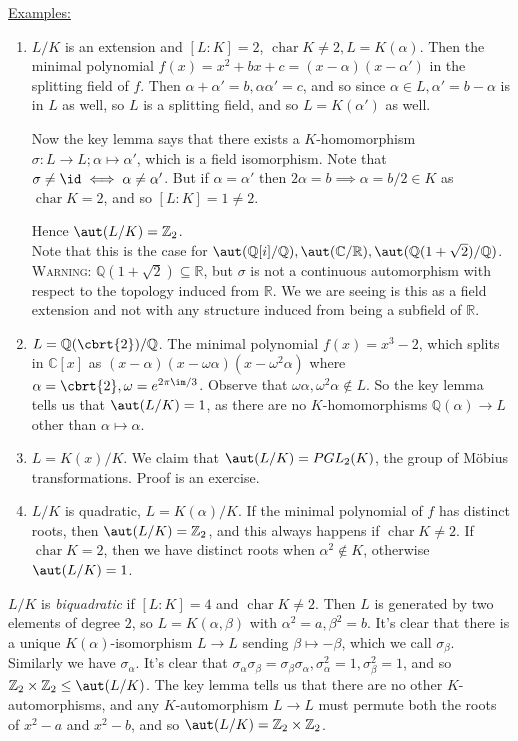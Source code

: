 \documentclass[a4paper, 10pt, twocolumn]{amsart}
\renewcommand{\charr}{\operatorname{char}}
\begin{document}
\underline{Examples:}
\begin{enumerate}
\item $L/K$ is an extension and $[L:K] = 2$, $\charr K \neq 2, L = K(\alpha)$. Then the minimal polynomial $f(x) = x^2 + bx + c = (x-\alpha)(x- \alpha')$ in the splitting field of $f$. Then $\alpha+\alpha' = b, \alpha\alpha' = c$, and so since $\alpha \in L, \alpha' = b-\alpha$ is in $L$ as well, so $L$ is a splitting field, and so $L=K(\alpha')$ as well.

Now the key lemma says that there exists a $K$-homomorphism $\sigma:L \to L; \alpha \mapsto \alpha'$, which is a field isomorphism. Note that $\sigma \neq \id \iff \alpha \neq \alpha'$. But if $\alpha = \alpha'$ then $2\alpha = b \implies \alpha = b/2 \in K$ as $\charr K = 2$, and so $[L:K] = 1 \neq 2$.

Hence $\aut(L/K) = \mathbb{Z}_2$. \\
Note that this is the case for $\aut(\mathbb{Q}[i]/\mathbb{Q}), \aut(\mathbb{C}/\mathbb{R}), \aut(\mathbb{Q}(1+\sqrt{2})/\mathbb{Q})$.\\
\textsc{Warning:} $\mathbb{Q}(1+\sqrt{2})\subseteq \mathbb{R}$, but $\sigma$ is not a continuous automorphism with respect to the topology induced from $\mathbb{R}$. We we are seeing is this as a field extension and not with any structure induced from being a subfield of $\mathbb{R}$.

\item $L = \mathbb{Q}(\cbrt{2}) / \mathbb{Q}$. The minimal polynomial $f(x) = x^3-2$, which splits in $\mathbb{C}[x]$ as $(x-\alpha)(x-\omega\alpha)(x-\omega^2\alpha)$ where $\alpha = \cbrt{2}, \omega= e^{2\pi\im/3}$. Observe that $\omega\alpha, \omega^2 \alpha \notin L$. So the key lemma tells us that $\aut(L/K) = 1$, as there are no $K$-homomorphisms $\mathbb{Q}(\alpha) \to L$ other than $\alpha \mapsto \alpha$. 

\item $L=K(x)/K$. We claim that $\aut(L/K) = PGL_2(K)$, the group of M\"obius transformations. Proof is an exercise.

\item $L/K$ is quadratic, $L=K(\alpha)/K$. If the minimal polynomial of $f$ has distinct roots, then $\aut(L/K) = \mathbb{Z}_2$, and this always happens if $\charr K \neq 2$. If $\charr K = 2$, then we have distinct roots when $\alpha^2 \notin K$, otherwise $\aut(L/K) = 1$.
\end{enumerate}
$L/K$ is \emph{biquadratic} if $[L:K] = 4$ and $\charr K \neq 2$. Then $L$ is generated by two elements of degree $2$, so $L = K(\alpha, \beta)$ with $\alpha^2 = a, \beta^2 = b$.  It's clear that there is a unique $K(\alpha)$-isomorphism $L \to L$ sending $\beta \mapsto -\beta$, which we call $\sigma_\beta$. Similarly we have $\sigma_\alpha$. It's clear that $\sigma_\alpha \sigma_\beta = \sigma_\beta\sigma_\alpha, \sigma_\alpha^2=1, \sigma_\beta^2=1$, and so $\mathbb{Z}_2 \times \mathbb{Z}_2 \leq \aut(L/K)$. The key lemma tells us that there are no other $K$-automorphisms, and any $K$-automorphism $L \to L$ must permute both the roots of $x^2-a$ and $x^2-b$, and so $\aut(L/K) = \mathbb{Z}_2 \times \mathbb{Z}_2$.
\end{document}
